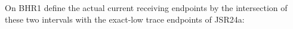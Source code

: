 On BHR1 define the actual current receiving endpoints
by the intersection of these two intervals with the
exact-low trace endpoints of JSR24a: